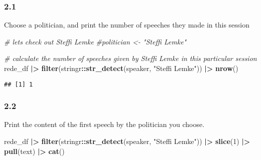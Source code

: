 \documentclass[
]{article}
\newenvironment{Shaded}{\begin{snugshade}}{\end{snugshade}}
\newcommand{\CommentTok}[1]{\textcolor[rgb]{0.56,0.35,0.01}{\textit{#1}}}
\newcommand{\DecValTok}[1]{\textcolor[rgb]{0.00,0.00,0.81}{#1}}
\newcommand{\FunctionTok}[1]{\textcolor[rgb]{0.13,0.29,0.53}{\textbf{#1}}}
\newcommand{\NormalTok}[1]{#1}
\newcommand{\SpecialCharTok}[1]{\textcolor[rgb]{0.81,0.36,0.00}{\textbf{#1}}}
\newcommand{\StringTok}[1]{\textcolor[rgb]{0.31,0.60,0.02}{#1}}
\begin{document}
\hypertarget{section-3}{%
\subsubsection{2.1}\label{section-3}}

Choose a politician, and print the number of speeches they made in this
session

\begin{Shaded}
\begin{Highlighting}[]
\CommentTok{\# let\textquotesingle{}s check out Steffi Lemke}
\CommentTok{\#politician \textless{}{-} "Steffi Lemke"}

\CommentTok{\# calculate the number of speeches given by Steffi Lemke in this particular session}
\NormalTok{rede\_df }\SpecialCharTok{|\textgreater{}} 
  \FunctionTok{filter}\NormalTok{(stringr}\SpecialCharTok{::}\FunctionTok{str\_detect}\NormalTok{(speaker, }\StringTok{"Steffi Lemke"}\NormalTok{)) }\SpecialCharTok{|\textgreater{}} 
  \FunctionTok{nrow}\NormalTok{()}
\end{Highlighting}
\end{Shaded}

\begin{verbatim}
## [1] 1
\end{verbatim}

\hypertarget{section-4}{%
\subsubsection{2.2}\label{section-4}}

Print the content of the first speech by the politician you choose.

\begin{Shaded}
\begin{Highlighting}[]
\NormalTok{rede\_df }\SpecialCharTok{|\textgreater{}} 
  \FunctionTok{filter}\NormalTok{(stringr}\SpecialCharTok{::}\FunctionTok{str\_detect}\NormalTok{(speaker, }\StringTok{"Steffi Lemke"}\NormalTok{)) }\SpecialCharTok{|\textgreater{}} 
  \FunctionTok{slice}\NormalTok{(}\DecValTok{1}\NormalTok{) }\SpecialCharTok{|\textgreater{}} 
  \FunctionTok{pull}\NormalTok{(text) }\SpecialCharTok{|\textgreater{}} 
  \FunctionTok{cat}\NormalTok{()}
\end{Highlighting}
\end{Shaded}
\end{document}
